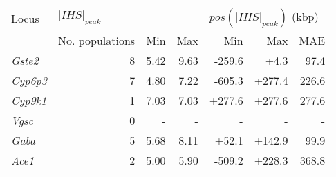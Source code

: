 \begin{tabular}{lrrrrrr}
\toprule
           Locus & \multicolumn{3}{l}{$|IHS|_{peak}$} & \multicolumn{3}{l}{$pos(|IHS|_{peak})$ (kbp)} \\
                 & No. populations &  Min &  Max &                       Min &    Max &   MAE \\
\midrule
  \textit{Gste2} &               8 & 5.42 & 9.63 &                    -259.6 &   +4.3 &  97.4 \\
 \textit{Cyp6p3} &               7 & 4.80 & 7.22 &                    -605.3 & +277.4 & 226.6 \\
 \textit{Cyp9k1} &               1 & 7.03 & 7.03 &                    +277.6 & +277.6 & 277.6 \\
   \textit{Vgsc} &               0 &    - &    - &                         - &      - &     - \\
   \textit{Gaba} &               5 & 5.68 & 8.11 &                     +52.1 & +142.9 &  99.9 \\
   \textit{Ace1} &               2 & 5.00 & 5.90 &                    -509.2 & +228.3 & 368.8 \\
\bottomrule
\end{tabular}

